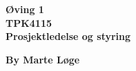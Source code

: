 \begin{titlepage}
\begin{center}

{\Huge \bf Øving 1} \\[1.0cm]
{\Huge \bf TPK4115} \\[1.0cm]
{\Large \bf Prosjektledelse og styring} \\[1.0cm]
\vspace{1cm}

{\bf By Marte Løge}


\end{center}
\end{titlepage}